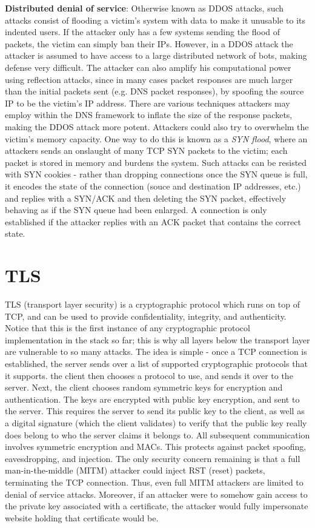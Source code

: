 \documentclass{article}
\begin{document}
\textbf{Distributed denial of service}: Otherwise known as DDOS attacks, such attacks consist of flooding a victim's system with data to make it unusable to its indented users. If the attacker only has a few systems sending the flood of packets, the victim can simply ban their IPs. However, in a DDOS attack the attacker is assumed to have access to a large distributed network of bots, making defense very difficult. The attacker can also amplify his computational power using reflection attacks, since in many cases packet responses are much larger than the initial packets sent (e.g. DNS packet responses), by spoofing the source IP to be the victim's IP address. There are various techniques attackers may employ within the DNS framework to inflate the size of the response packets, making the DDOS attack more potent. Attackers could also try to overwhelm the victim's memory capacity. One way to do this is known as a \textit{SYN flood}, where an attackers sends an onslaught of many TCP SYN packets to the victim; each packet is stored in memory and burdens the system. Such attacks can be resisted with SYN cookies - rather than dropping connections once the SYN queue is full, it encodes the state of the connection (souce and destination IP addresses, etc.) and replies with a SYN/ACK and then deleting the SYN packet, effectively behaving as if the SYN queue had been enlarged. A connection is only established if the attacker replies with an ACK packet that contains the correct state.

\section{TLS}
TLS (transport layer security) is a cryptographic protocol which runs on top of TCP, and can be used to provide confidentiality, integrity, and authenticity. Notice that this is the first instance of any cryptographic protocol implementation in the stack so far; this is why all layers below the transport layer are vulnerable to so many attacks. The idea is simple - once a TCP connection is established, the server sends over a list of supported cryptographic protocols that it supports. the client then chooses a protocol to use, and sends it over to the server. Next, the client chooses random symmetric keys for encryption and authentication. The keys are encrypted with public key encryption, and sent to the server. This requires the server to send its public key to the client, as well as a digital signature (which the client validates) to verify that the public key really does belong to who the server claims it belongs to. All subsequent communication involves symmetric encryption and MACs.
\newline \newline
This protects against packet spoofing, eavesdropping, and injection. The only security concern remaining is that a full man-in-the-middle (MITM) attacker could inject RST (reset) packets, terminating the TCP connection. Thus, even full MITM attackers are limited to denial of service attacks. Moreover, if an attacker were to somehow gain access to the private key associated with a certificate, the attacker would fully impersonate website holding that certificate would be.
\end{document}
